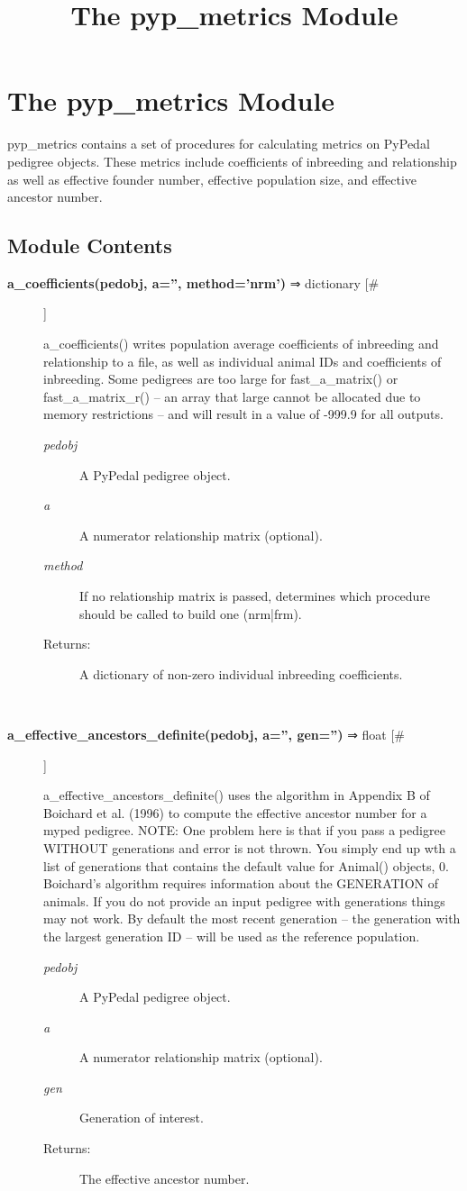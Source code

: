 \documentclass[10pt]{article}
\title{The pyp\_metrics Module}
\begin{document}
\section*{The pyp\_metrics Module}


 pyp\_metrics contains a set of procedures for calculating metrics on PyPedal pedigree objects. These metrics include coefficients of inbreeding and relationship as well as effective founder number, effective population size, and effective ancestor number.
\subsection*{Module Contents}
\begin{description}
\item[\textbf{a\_coefficients(pedobj, a='', method='nrm')}
 ⇒ dictionary [\#]]

 a\_coefficients() writes population average coefficients of inbreeding and relationship to a file, as well as individual animal IDs and coefficients of inbreeding. Some pedigrees are too large for fast\_a\_matrix() or fast\_a\_matrix\_r() -- an array that large cannot be allocated due to memory restrictions -- and will result in a value of -999.9 for all outputs.
\begin{description}
\item[\emph{pedobj}
] A PyPedal pedigree object.
\item[\emph{a}
] A numerator relationship matrix (optional).
\item[\emph{method}
] If no relationship matrix is passed, determines which procedure should be called to build one (nrm|frm).
\item[Returns:] A dictionary of non-zero individual inbreeding coefficients.

\end{description}
\\ 

\item[\textbf{a\_effective\_ancestors\_definite(pedobj, a='', gen='')}
 ⇒ float [\#]]

 a\_effective\_ancestors\_definite() uses the algorithm in Appendix B of Boichard et al. (1996) to compute the effective ancestor number for a myped pedigree. NOTE: One problem here is that if you pass a pedigree WITHOUT generations and error is not thrown. You simply end up wth a list of generations that contains the default value for Animal() objects, 0. Boichard's algorithm requires information about the GENERATION of animals. If you do not provide an input pedigree with generations things may not work. By default the most recent generation -- the generation with the largest generation ID -- will be used as the reference population.
\begin{description}
\item[\emph{pedobj}
] A PyPedal pedigree object.
\item[\emph{a}
] A numerator relationship matrix (optional).
\item[\emph{gen}
] Generation of interest.
\item[Returns:] The effective ancestor number.


\end{description}
\end{description}
\end{document}
